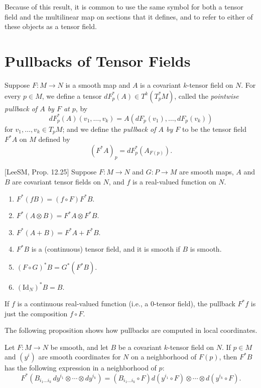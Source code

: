 Because of this result, it is common to use the same symbol for both a tensor field and the multilinear map on sections that it defines, and to refer to either of these objects as a tensor field.

\section{Pullbacks of Tensor Fields}

Suppose $F: M \to N$ is a smooth map and $A$ is a covariant $k$-tensor field on $N$. For every $p \in M$, we define a tensor $dF_p^*(A) \in T^k(T_p^* M)$, called the \emph{pointwise pullback of $A$ by $F$ at $p$}, by
\[
dF_p^*(A)(v_1, \ldots, v_k) = A(dF_p(v_1), \ldots, dF_p(v_k))
\]
for $v_1, \ldots, v_k \in T_p M$; and we define the \emph{pullback of $A$ by $F$} to be the tensor field $F^* A$ on $M$ defined by
\[
(F^* A)_p = dF_p^*(A_{F(p)}).
\]

\begin{proposition}
\label{prop:tensor-pullback-properties}

[LeeSM, Prop. 12.25] Suppose $F: M \to N$ and $G: P \to M$ are smooth maps, $A$ and $B$ are covariant tensor fields on $N$, and $f$ is a real-valued function on $N$.
\begin{enumerate}
\item[(a)] $F^*(fB) = (f \circ F) F^* B$.
\item[(b)] $F^*(A \otimes B) = F^* A \otimes F^* B$.
\item[(c)] $F^*(A + B) = F^* A + F^* B$.
\item[(d)] $F^* B$ is a (continuous) tensor field, and it is smooth if $B$ is smooth.
\item[(e)] $(F \circ G)^* B = G^*(F^* B)$.
\item[(f)] $(\text{Id}_N)^* B = B$.
\end{enumerate}
\end{proposition}

If $f$ is a continuous real-valued function (i.e., a 0-tensor field), the pullback $F^* f$ is just the composition $f \circ F$.

The following proposition shows how pullbacks are computed in local coordinates.

\begin{proposition}
\label{prop:pullback-computation-coordinates}

Let $F: M \to N$ be smooth, and let $B$ be a covariant $k$-tensor field on $N$. If $p \in M$ and $(y^i)$ are smooth coordinates for $N$ on a neighborhood of $F(p)$, then $F^* B$ has the following expression in a neighborhood of $p$:
\[
F^* \left( B_{i_1 \ldots i_k} \, dy^{i_1} \otimes \cdots \otimes dy^{i_k} \right) = \left( B_{i_1 \ldots i_k} \circ F \right) d(y^{i_1} \circ F) \otimes \cdots \otimes d(y^{i_k} \circ F).
\]
\end{proposition}

